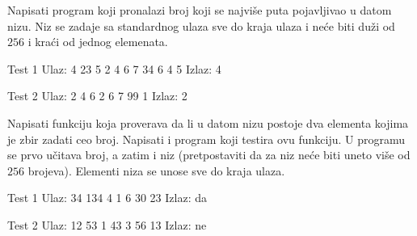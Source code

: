 \begin{Answer}[ref=502]
\end{Answer}
\begin{Exercise}[label=503]
  Napisati program koji pronalazi broj koji se najviše puta
  pojavljivao u datom nizu. Niz se zadaje sa standardnog ulaza sve do
  kraja ulaza i neće biti duži od $256$ i kraći od jednog
  elemenata. 
  
\begin{miditest}
\begin{test}{Test 1}
Ulaz: 4 23 5 2 4 6 7 34 6 4 5
Izlaz:  4
\end{test}
\end{miditest}
\begin{miditest}
\begin{test}{Test 2}
Ulaz:   2 4 6 2 6 7 99 1
Izlaz:  2
\end{test}
\end{miditest}
  
\end{Exercise}

\begin{Answer}[ref=503]
\end{Answer}
\begin{Exercise}[label=504]
  Napisati funkciju koja proverava da li u datom nizu postoje dva
  elementa kojima je zbir zadati ceo broj. Napisati i program koji
  testira ovu funkciju. U programu se prvo učitava broj, a zatim i niz
  (pretpostaviti da za niz neće biti uneto više od $256$ brojeva).
  Elementi niza se unose sve do kraja ulaza. 
  
\begin{miditest}
\begin{test}{Test 1}
Ulaz:   34 134 4 1 6 30 23
Izlaz:  da
\end{test}
\end{miditest}
\begin{miditest}
\begin{test}{Test 2}
Ulaz:   12 53 1 43 3 56 13
Izlaz:  ne
\end{test}
\end{miditest}
  
\end{Exercise}


